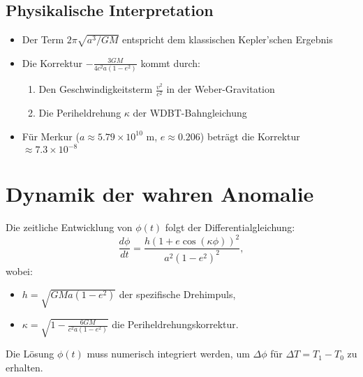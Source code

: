 \subsection*{Physikalische Interpretation}
\begin{itemize}
\item Der Term \( 2\pi \sqrt{a^3/GM} \) entspricht dem klassischen Kepler'schen Ergebnis
\item Die Korrektur \( -\frac{3GM}{4c^2 a(1-e^2)} \) kommt durch:
  \begin{enumerate}
  \item Den Geschwindigkeitsterm \( \frac{v^2}{c^2} \) in der Weber-Gravitation
  \item Die Periheldrehung \( \kappa \) der WDBT-Bahngleichung
  \end{enumerate}
\item Für Merkur (\( a \approx 5.79 \times 10^{10} \) m, \( e \approx 0.206 \)) beträgt die Korrektur \( \approx 7.3 \times 10^{-8} \)
\end{itemize}

\section{Dynamik der wahren Anomalie}
Die zeitliche Entwicklung von \(\phi(t)\) folgt der Differentialgleichung:
\[
\frac{d\phi}{dt} = \frac{h (1 + e \cos(\kappa \phi))^2}{a^2 (1-e^2)^2},
\]
wobei:
\begin{itemize}
\item \(h = \sqrt{GMa(1-e^2)}\) der spezifische Drehimpuls,
\item \(\kappa = \sqrt{1 - \frac{6GM}{c^2 a(1-e^2)}}\) die Periheldrehungskorrektur.
\end{itemize}
Die Lösung \(\phi(t)\) muss numerisch integriert werden, um \(\Delta \phi\) für \(\Delta T = T_1 - T_0\) zu erhalten.
